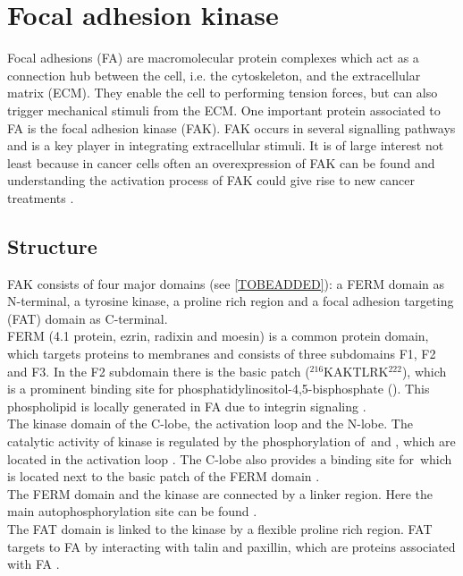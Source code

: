 \section{Focal adhesion kinase}
Focal adhesions (FA) are macromolecular protein complexes which act as a connection hub between the cell, i.e. the cytoskeleton, and the extracellular matrix (ECM). They enable the cell to performing tension forces, but can also trigger mechanical stimuli from the ECM. One important protein associated to FA is the focal adhesion kinase (FAK). FAK occurs in several signalling pathways and is a key player in integrating extracellular stimuli. It is of large interest not least because in cancer cells often an overexpression of FAK can be found and understanding the activation process of FAK could give rise to new cancer treatments \autocite{cancerFAK}.
\subsection{Structure}
FAK consists of four major domains (see \autoref{TOBEADDED}): a FERM domain as N-terminal, a tyrosine kinase, a proline rich region and a focal adhesion targeting (FAT) domain as C-terminal.\\
FERM (4.1 protein, ezrin, radixin and moesin) is a common protein domain, which targets proteins to membranes \autocite{fermdomain} and consists of three subdomains F1, F2 and F3. In the F2 subdomain there is the basic patch  ($^{216}$KAKTLRK$^{222}$), which is a prominent binding site for phosphatidylinositol-4,5-bisphosphate (\pip). This phospholipid is locally generated in FA due to integrin signaling \autocite{pap001}.\\
The kinase domain of the C-lobe, the activation loop and the N-lobe. The catalytic activity of kinase is regulated by the phosphorylation of \,and , which are located in the activation loop \autocite{tyrosinePhosphor}. The C-lobe also provides a binding site for \pip\,which is located next to the basic patch of the FERM domain \autocite{pap002}.\\
The FERM domain and the kinase are connected by a linker region. Here the main autophosphorylation site  can be found \autocite{pap001}.\\
The FAT domain is linked to the kinase by a flexible proline rich region. FAT targets to FA by interacting with talin and paxillin, which are proteins associated with FA \autocite{fatdomain}.
